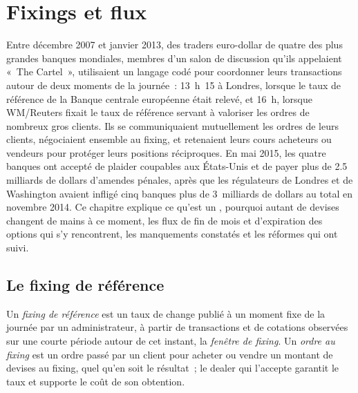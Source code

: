 \chapter{Fixings et flux}\label{ch:m2:fixings-and-flows}

Entre décembre 2007 et janvier 2013, des traders euro-dollar de quatre des
plus grandes banques mondiales, membres d'un salon de discussion qu'ils appelaient «~The Cartel~», utilisaient
un langage codé pour coordonner leurs transactions autour de deux moments de la journée~: 13~h~15
à Londres, lorsque le taux de référence de la Banque centrale européenne était
relevé, et 16~h, lorsque WM/Reuters fixait le taux de référence servant à valoriser les
ordres de nombreux gros clients. Ils
se communiquaient mutuellement les ordres de leurs clients, négociaient ensemble au fixing, et retenaient
leurs cours acheteurs ou vendeurs pour protéger leurs positions réciproques. En mai 2015, les quatre
banques ont accepté de plaider coupables aux États-Unis et de payer plus de 2.5
milliards de dollars d'amendes pénales, après que les régulateurs de Londres et de Washington avaient infligé
cinq banques plus de 3~milliards de dollars au total en novembre 2014. Ce chapitre
explique ce qu'est un , pourquoi autant de devises changent de mains à ce moment, les
flux de fin de mois et d'expiration des options qui s'y rencontrent, les manquements
constatés et les réformes qui ont suivi.

\section{Le fixing de référence}

\begin{definition}\label{def:m2:fixings-and-flows:fix}
Un \emph{fixing de référence} est un taux de change publié à un
moment fixe de la journée par un administrateur, à partir de transactions et de cotations observées sur une courte
période autour de cet instant, la \emph{fenêtre de fixing}. Un
\emph{ordre au fixing} est un ordre passé par un client pour acheter ou vendre un
montant de devises au fixing, quel qu'en soit le résultat~; le dealer qui
l'accepte garantit le taux et supporte le coût de son obtention.
\end{definition}

